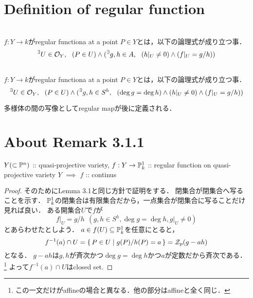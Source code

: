 \documentclass[a4paper]{jarticle}
\begin{document}
\section{Definition of regular function}
    \begin{Def} \mbox{} \\
        $f: Y \to k$がregular functiona at a point $P \in Y$とは，以下の論理式が成り立つ事．
        \[ {}^{\exists} U \in \mathcal{O}_Y,~~ (P \in U) \land ({}^{\exists} g,h \in A,~~ (h|_U \neq 0) \land (f|_U=g/h) ) \]
    \end{Def}

    \begin{Def} \mbox{} \\
        $f: Y \to k$がregular functiona at a point $P \in Y$とは，以下の論理式が成り立つ事．
        \[ {}^{\exists} U \in \mathcal{O}_Y,~~ (P \in U) \land ({}^{\exists} g,h \in S^h,~~ (\deg g=\deg h) \land (h|_U \neq 0) \land (f|_U=g/h) ) \]
    \end{Def}

    多様体の間の写像としてregular mapが後に定義される．

\section{About Remark 3.1.1}
    \begin{Lemma}
        $Y (\subset \mathbb{P}^n)$ :: quasi-projective variety,
        $f: Y \to \mathbb{P}^1_k$ :: regular function on quasi-projective variety $Y$
        $\implies$
        $f$ :: continus
    \end{Lemma}
    \begin{proof}
        そのためにLemma 3.1と同じ方針で証明をする．
        閉集合が閉集合へ写ることを示す．
        $\mathbb{P}^1_k$の閉集合は有限集合だから，一点集合が閉集合に写ることだけ見れば良い．
        ある開集合$U$で$f$が
        \[ f|_U=g/h ~~ (g,h \in S^h, \deg g=\deg h, g|_U \neq 0) \]とあらわせたとしよう．
        $a \in f(U) \subseteq \mathbb{P}^1_k$を任意にとると，
        \[ f^{-1}(a) \cap U=\set{ P \in U | g(P)/h(P)=a }=\mathcal{Z}_p(g-ah) \]
        となる．
        $g-ah$は$g,h$が斉次かつ$\deg g=\deg h$かつ$a$が定数だから斉次である．
        \footnote{この一文だけがaffineの場合と異なる．他の部分はaffineと全く同じ．}
        よって$f^{-1}(a) \cap U$はclosed set.
    \end{proof}
\end{document}
